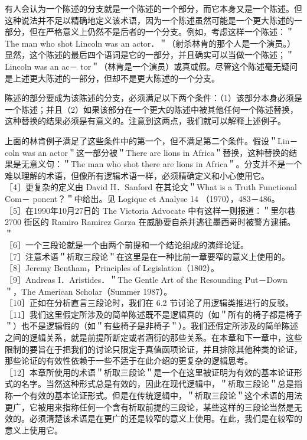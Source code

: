 有人会认为一个陈述的分支就是一个陈述的一个部分，而它本身又是一个陈述。但这种说法并不足以精确地定义该术语，因为一个陈述虽然可能是一个更大陈述的一部分，但在严格意义上仍然不是后者的一个分支。例如，考虑这样一个陈述：＂The man who shot Lincoln was an actor．＂（射杀林肯的那个人是一个演员。）显然，这个陈述的最后四个语词是它的一部分，并且确实可以当做一个陈述；＂Lincoln was an ac－ tor＂（林肯是一个演员）或真或假。尽管这个陈述毫无疑问是上述更大陈述的一部分，但却不是更大陈述的一个分支。

陈述的部分要成为该陈述的分支，必须满足以下两个条件：（1）该部分本身必须是一个陈述；并且（2）如果该部分在一个更大的陈述中被其他任何一个陈述替换，这种替换的结果必须是有意义的。注意到这两点，我们就可以解释上述例子。

上面的林肯例子满足了这些条件中的第一个，但不满足第二个条件。假设＂Lin－ coln was an actor＂这一部分被＂There are lions in Africa＂替换，这种替换的结果是无意义句：＂The man who shot there are lions in Africa＂。分支并不是一个难以理解的术语，但像所有逻辑术语一样，必须精确定义和小心使用它。\\
［4］更复杂的定义由 David H．Sanford 在其论文＂What is a Truth Functional Com－ ponent？＂中给出。见 Logique et Analyse 14 （1970），483－486。\\
［5］在1990年10月27日的 The Victoria Advocate 中有这样一则报道：＂里尔巷 2700 街区的 Ramiro Ramirez Garza 在威胁要自杀并逃往墨西哥时被警方逮捕。＂\\
［6］一个三段论就是一个由两个前提和一个结论组成的演绎论证。\\
［7］注意术语＂析取三段论＂在这里是在一种比前一章要窄的意义上使用的。\\
［8］Jeremy Bentham，Principles of Legislation（1802）。\\
［9］Andreas I．Aristides．＂The Gentle Art of the Resounding Put－Down＂，The American Scholar（Summer 1987）。\\
［10］正如在分析直言三段论时，我们在 6.2 节讨论了用逻辑类推进行的反驳。\\
［11］我们这里假定所涉及的简单陈述既不是逻辑真的（如＂所有的椅子都是椅子＂）也不是逻辑假的（如＂有些椅子是非椅子＂）。我们还假定所涉及的简单陈述之间的逻辑关系，就是前提所断定或者涵衍的那些关系。在本章和下一章中，这些限制的要旨在于把我们的讨论只限定于真值函项论证，并且排除其他种类的论证，那些论证的有效性依赖于一些不适于在此介绍的更复杂的逻辑思考。\\
［12］本章所使用的术语＂析取三段论＂是一个在这里被证明为有效的基本论证形式的名字。当然这种形式总是有效的，因此在现代逻辑中，＂析取三段论＂总是指称一个有效的基本论证形式。但是在传统逻辑中，＂析取三段论＂这个术语的用法更广，它被用来指称任何一个含有析取前提的三段论，某些这样的三段论当然是无效的。必须清楚该术语是在更广的还是较窄的意义上使用。在此，我们是在较窄的意义上使用它。\\
